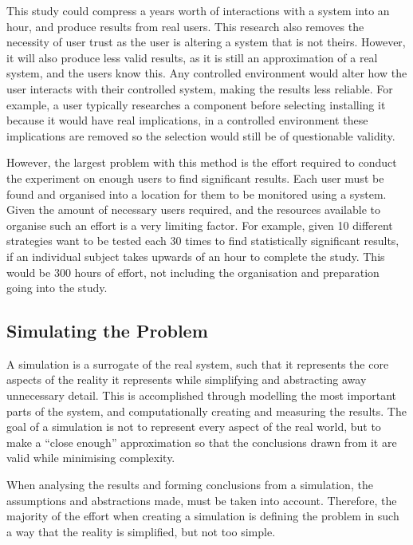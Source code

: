 This study could compress a years worth of interactions with a system into an hour, and produce results from real users. 
This research also removes the necessity of user trust as the user is altering a system that is not theirs.
However, it will also produce less valid results, as it is still an approximation of a real system, and the users know this.
Any controlled environment would alter how the user interacts with their controlled system, making the results less reliable.
For example, a user typically researches a component before selecting installing it because it would have real implications, 
in a controlled environment these implications are removed so the selection would still be of questionable validity.

However, the largest problem with this method is the effort required to conduct the experiment on enough users to find significant results.
Each user must be found and organised into a location for them to be monitored using a system.
Given the amount of necessary users required, and the resources available to organise such an effort is a very limiting factor.
For example, given 10 different strategies want to be tested each 30 times to find statistically significant results, 
if an individual subject takes upwards of an hour to complete the study.
This would be 300 hours of effort, not including the organisation and preparation going into the study.

\subsection{Simulating the Problem}
A simulation is a surrogate of the real system, 
such that it represents the core aspects of the reality it represents while simplifying and abstracting away unnecessary detail.
This is accomplished through modelling the most important parts of the system, 
and computationally creating and measuring the results. 
The goal of a simulation is not to represent every aspect of the real world, 
but to make a ``close enough'' approximation so that the conclusions drawn from it are valid while minimising complexity.

When analysing the results and forming conclusions from a simulation, 
the assumptions and abstractions made, must be taken into account.
Therefore, the majority of the effort when creating a simulation is defining the problem in such a way that the reality is simplified, but not too simple.

